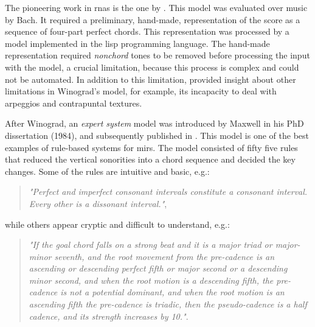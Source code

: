 


The pioneering work in \glspl{rna} is the one by
\textcite{winograd1968linguistics}. This model was evaluated
over music by Bach. It required a preliminary, hand-made,
representation of the score as a sequence of four-part
perfect chords. This representation was processed by a model
implemented in the \gls{lisp} programming language. The
hand-made representation required \emph{nonchord} tones to
be removed before processing the input with the model, a
crucial limitation, because this process is complex and
could not be automated. In addition to this limitation,
\textcite{temperley1997algorithm} provided insight about
other limitations in Winograd's model, for example, its
incapacity to deal with arpeggios and contrapuntal textures.

After Winograd, an \emph{expert system} model was introduced
by Maxwell in his PhD dissertation (1984), and subsequently
published in \textcite{maxwell1992expert}. This model is one
of the best examples of rule-based systems for \glspl{mir}.
The model consisted of fifty five rules that reduced the
vertical sonorities into a chord sequence and decided
the key changes. Some of the rules are intuitive and basic,
e.g.:

\begin{quote} \centering \emph{"Perfect and imperfect
consonant intervals constitute a consonant interval. Every
other is a dissonant interval."}, \end{quote}

    while others appear cryptic and difficult to understand,
    e.g.:

    \begin{quote} \centering \emph{"If the goal chord falls
    on a strong beat and it is a major triad or major-minor
    seventh, and the root movement from the pre-cadence is
    an ascending or descending perfect fifth or major second
    or a descending minor second, and when the root motion
    is a descending fifth, the pre-cadence is not a
    potential dominant, and when the root motion is an
    ascending fifth the pre-cadence is triadic, then the
    pseudo-cadence is a half cadence, and its strength
    increases by 10."}. \end{quote}

